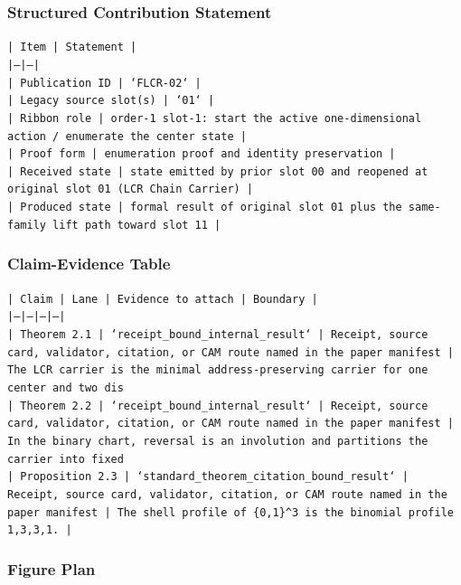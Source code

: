 \documentclass[11pt]{article}
\begin{document}
\subsubsection*{Structured Contribution Statement}

\noindent\texttt{| Item | Statement |}\\
\noindent\texttt{|---|---|}\\
\noindent\texttt{| Publication ID | `FLCR-02` |}\\
\noindent\texttt{| Legacy source slot(s) | `01` |}\\
\noindent\texttt{| Ribbon role | order-1 slot-1: start the active one-dimensional action / enumerate the center state |}\\
\noindent\texttt{| Proof form | enumeration proof and identity preservation |}\\
\noindent\texttt{| Received state | state emitted by prior slot 00 and reopened at original slot 01 (LCR Chain Carrier) |}\\
\noindent\texttt{| Produced state | formal result of original slot 01 plus the same-family lift path toward slot 11 |}\\

\subsubsection*{Claim-Evidence Table}

\noindent\texttt{| Claim | Lane | Evidence to attach | Boundary |}\\
\noindent\texttt{|---|---|---|---|}\\
\noindent\texttt{| Theorem 2.1 | `receipt\_bound\_internal\_result` | Receipt, source card, validator, citation, or CAM route named in the paper manifest | The LCR carrier is the minimal address-preserving carrier for one center and two dis}\\
\noindent\texttt{| Theorem 2.2 | `receipt\_bound\_internal\_result` | Receipt, source card, validator, citation, or CAM route named in the paper manifest | In the binary chart, reversal is an involution and partitions the carrier into fixed}\\
\noindent\texttt{| Proposition 2.3 | `standard\_theorem\_citation\_bound\_result` | Receipt, source card, validator, citation, or CAM route named in the paper manifest | The shell profile of \{0,1\}\textasciicircum{}3 is the binomial profile 1,3,3,1. |}\\

\subsubsection*{Figure Plan}
\end{document}
